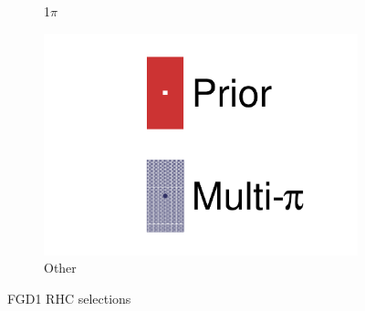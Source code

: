 \begin{figure}[h]
\begin{subfigure}[t]{0.32\textwidth}
		\caption{1$\pi$}
	\end{subfigure}
	\begin{subfigure}[t]{0.32\textwidth}
		\includegraphics[width=\textwidth,page=54, trim={0mm 0mm 0mm 0mm}, clip]{figures/mach3/2018/data/2018a_FixedCov_RedCov_Mpi_Data_merge_drawPar_withDet}
		\caption{Other}
	\end{subfigure}
	\caption{FGD1 \numu RHC selections}
	\label{fig:data_multipi_det_fdg1_numuRHC}
\end{figure}

